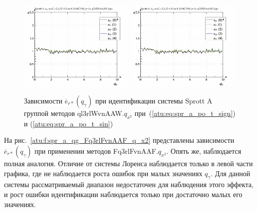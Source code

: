 \begin{figure}[htb!]
  \centerline{
    \includegraphics[width=0.49\textwidth]{p/cha/spr_a/ql3rlWvnAAW_x2/sprott_a_id-p_q_gamma_sign.png}
    \hfill
    \includegraphics[width=0.49\textwidth]{p/cha/spr_a/ql3rlWvnAAW_x2/sprott_a_id-p_q_gamma_sign.png}
  }
  \caption{Зависимости $\overline{e}_{r*}(q_\gamma)$ при идентификации системы Sprott A группой методов ql3rlWvnAAW.$q_{x^2}$
   при~(\ref{atu:eq:spr_a_po_t_sign}) и (\ref{atu:eq:spr_a_po_t_sin})}
  \label{atu:f:spr_a_ql3rlWvnAAW_q_x2}
\end{figure}

На рис.~\ref{atu:f:spr_a_qg_Fq3rlFvnAAF_q_x2} представлены зависимости
$\overline{e}_{r*}(q_\gamma)$ при применении методов Fq3rlFvnAAF.$q_{x^2}$.
Опять же, наблюдается полная аналогия. Отличие от системы Лоренса наблюдается только
в левой части графика, где не наблюдается роста ошибок при
малых значениях $q_\gamma$. Для данной системы
рассматриваемый диапазон недостаточен для наблюдения этого эффекта,
и рост ошибки идентификации наблюдается только при достаточно малых его значениях.

